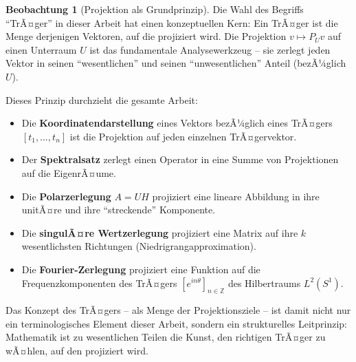 ﻿\documentclass[a4paper,12pt]{report}
\theoremstyle{definition}
\newtheorem{beobachtung}{Beobachtung}
\begin{document}
\begin{beobachtung}[Projektion als Grundprinzip]
    Die Wahl des Begriffs ``TrÃ¤ger'' in dieser Arbeit
    hat einen konzeptuellen Kern: Ein TrÃ¤ger ist die Menge derjenigen
    Vektoren, auf die projiziert wird. Die Projektion
    $v \mapsto P_U v$ auf einen Unterraum $U$ ist das fundamentale
    Analysewerkzeug -- sie zerlegt jeden Vektor in seinen
    ``wesentlichen'' und seinen ``unwesentlichen'' Anteil
    (bezÃ¼glich $U$).

    Dieses Prinzip durchzieht die gesamte Arbeit:
    \begin{itemize}
        \item[-] Die \textbf{Koordinatendarstellung} eines Vektors
              bezÃ¼glich eines TrÃ¤gers $[t_1, \ldots, t_n]$ ist die
              Projektion auf jeden einzelnen TrÃ¤gervektor.
        \item[-] Der \textbf{Spektralsatz} zerlegt einen Operator
              in eine Summe von Projektionen auf die EigenrÃ¤ume.
        \item[-] Die \textbf{Polarzerlegung} $A = UH$ projiziert
              eine lineare Abbildung in ihre unitÃ¤re und ihre
              ``streckende'' Komponente.
        \item[-] Die \textbf{singulÃ¤re Wertzerlegung} projiziert
              eine Matrix auf ihre $k$ wesentlichsten
              Richtungen (Niedrigrangapproximation).
        \item[-] Die \textbf{Fourier-Zerlegung} projiziert eine
              Funktion auf die Frequenzkomponenten des TrÃ¤gers
              $[e^{in\theta}]_{n \in \mathbb{Z}}$ des Hilbertraums
              $L^2(S^1)$.
    \end{itemize}
    Das Konzept des TrÃ¤gers -- als Menge der Projektionsziele --
    ist damit nicht nur ein terminologisches Element dieser Arbeit,
    sondern ein strukturelles Leitprinzip: Mathematik ist zu
    wesentlichen Teilen die Kunst, den richtigen TrÃ¤ger zu wÃ¤hlen,
    auf den projiziert wird.
\end{beobachtung}
\end{document}
